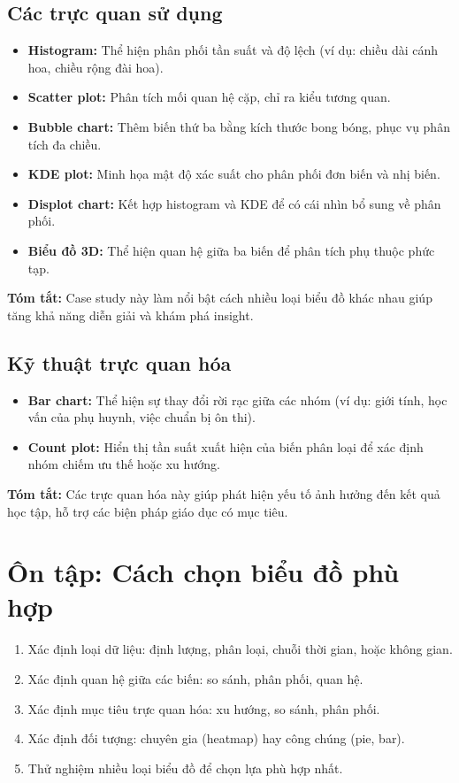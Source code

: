 \documentclass[11pt]{article}
\begin{document}
\subsection{Các trực quan sử dụng}
\begin{itemize}
    \item \textbf{Histogram:} Thể hiện phân phối tần suất và độ lệch (ví dụ: chiều dài cánh hoa, chiều rộng đài hoa).
    \item \textbf{Scatter plot:} Phân tích mối quan hệ cặp, chỉ ra kiểu tương quan.
    \item \textbf{Bubble chart:} Thêm biến thứ ba bằng kích thước bong bóng, phục vụ phân tích đa chiều.
    \item \textbf{KDE plot:} Minh họa mật độ xác suất cho phân phối đơn biến và nhị biến.
    \item \textbf{Displot chart:} Kết hợp histogram và KDE để có cái nhìn bổ sung về phân phối.
    \item \textbf{Biểu đồ 3D:} Thể hiện quan hệ giữa ba biến để phân tích phụ thuộc phức tạp.
\end{itemize}

\textbf{Tóm tắt:} Case study này làm nổi bật cách nhiều loại biểu đồ khác nhau giúp tăng khả năng diễn giải và khám phá insight.


\subsection{Kỹ thuật trực quan hóa}
\begin{itemize}
    \item \textbf{Bar chart:} Thể hiện sự thay đổi rời rạc giữa các nhóm (ví dụ: giới tính, học vấn của phụ huynh, việc chuẩn bị ôn thi).
    \item \textbf{Count plot:} Hiển thị tần suất xuất hiện của biến phân loại để xác định nhóm chiếm ưu thế hoặc xu hướng.
\end{itemize}

\textbf{Tóm tắt:} Các trực quan hóa này giúp phát hiện yếu tố ảnh hưởng đến kết quả học tập, hỗ trợ các biện pháp giáo dục có mục tiêu.

\section{Ôn tập: Cách chọn biểu đồ phù hợp}
\begin{enumerate}
    \item Xác định loại dữ liệu: định lượng, phân loại, chuỗi thời gian, hoặc không gian.
    \item Xác định quan hệ giữa các biến: so sánh, phân phối, quan hệ.
    \item Xác định mục tiêu trực quan hóa: xu hướng, so sánh, phân phối.
    \item Xác định đối tượng: chuyên gia (heatmap) hay công chúng (pie, bar).
    \item Thử nghiệm nhiều loại biểu đồ để chọn lựa phù hợp nhất.
\end{enumerate}
\end{document}
